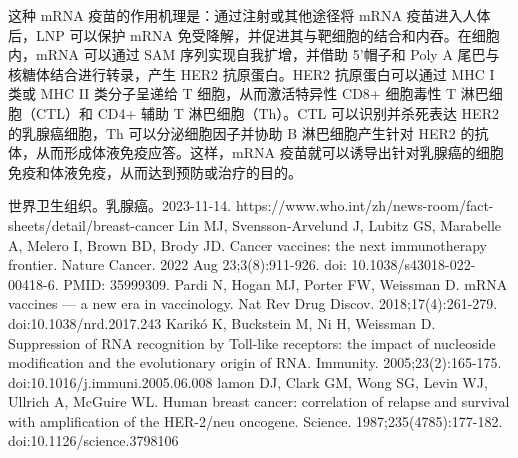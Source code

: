 \documentclass{ctexart}
\begin{document}
    这种 mRNA 疫苗的作用机理是：通过注射或其他途径将 mRNA 疫苗进入人体后，LNP 可以保护 mRNA 免受降解，并促进其与靶细胞的结合和内吞。在细胞内，mRNA 可以通过 SAM 序列实现自我扩增，并借助 5’帽子和 Poly A 尾巴与核糖体结合进行转录，产生 HER2 抗原蛋白。HER2 抗原蛋白可以通过 MHC I 类或 MHC II 类分子呈递给 T 细胞，从而激活特异性 CD8+ 细胞毒性 T 淋巴细胞（CTL）和 CD4+ 辅助 T 淋巴细胞（Th）。CTL 可以识别并杀死表达 HER2 的乳腺癌细胞，Th 可以分泌细胞因子并协助 B 淋巴细胞产生针对 HER2 的抗体，从而形成体液免疫应答。这样，mRNA 疫苗就可以诱导出针对乳腺癌的细胞免疫和体液免疫，从而达到预防或治疗的目的。


    \begin{thebibliography}{99}
         世界卫生组织。乳腺癌。2023-11-14. https://www.who.int/zh/news-room/fact-sheets/detail/breast-cancer 
         Lin MJ, Svensson-Arvelund J, Lubitz GS, Marabelle A, Melero I, Brown BD, Brody JD. Cancer vaccines: the next immunotherapy frontier. Nature Cancer. 2022 Aug 23;3(8):911-926. doi: 10.1038/s43018-022-00418-6. PMID: 35999309.
         Pardi N, Hogan MJ, Porter FW, Weissman D. mRNA vaccines — a new era in vaccinology. Nat Rev Drug Discov. 2018;17(4):261-279. doi:10.1038/nrd.2017.243
         Karikó K, Buckstein M, Ni H, Weissman D. Suppression of RNA recognition by Toll-like receptors: the impact of nucleoside modification and the evolutionary origin of RNA. Immunity. 2005;23(2):165-175. doi:10.1016/j.immuni.2005.06.008
         lamon DJ, Clark GM, Wong SG, Levin WJ, Ullrich A, McGuire WL. Human breast cancer: correlation of relapse and survival with amplification of the HER-2/neu oncogene. Science. 1987;235(4785):177-182. doi:10.1126/science.3798106

    \end{thebibliography}
\end{document}
